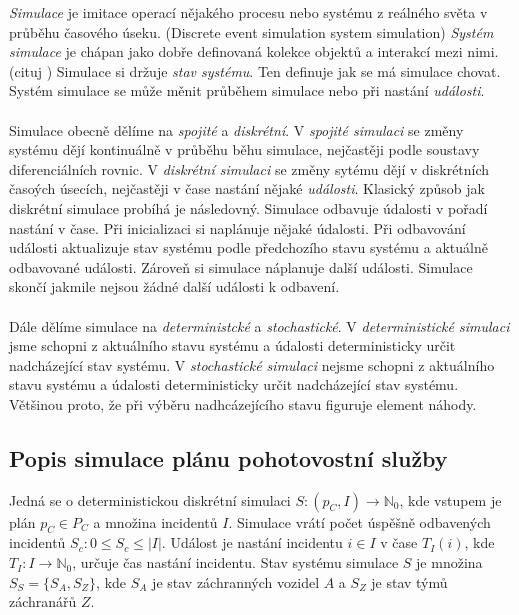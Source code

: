 \textit{Simulace} je imitace operací nějakého procesu nebo systému z reálného světa v průběhu časového úseku. (Discrete event simulation system simulation) %
\textit{Systém simulace} je chápan jako dobře definovaná kolekce objektů a interakcí mezi nimi. (cituj ) %
Simulace si držuje \textit{stav systému}. Ten definuje jak se má simulace chovat.
Systém simulace se může měnit průběhem simulace nebo při nastání \textit{události}.
\\
\\
Simulace obecně dělíme na \textit{spojité} a \textit{diskrétní}.
V \textit{spojité simulaci} se změny systému dějí kontinuálně v průběhu běhu simulace, nejčastěji podle soustavy diferenciálních rovnic.
V \textit{diskrétní simulaci} se změny sytému dějí v diskrétních časoých úsecích, nejčastěji v čase nastání nějaké \textit{události}.
Klasický způsob jak diskrétní simulace probíhá je následovný.
Simulace odbavuje údalosti v pořadí nastání v čase.
Při inicializaci si naplánuje nějaké údalosti.
Při odbavování události aktualizuje stav systému podle předchozího stavu systému a aktuálně odbavované události. Zároveň si simulace náplanuje další události. 
Simulace skončí jakmile nejsou žádné další události k odbavení.
\\
\\
Dále dělíme simulace na \textit{deterministcké} a \textit{stochastické}.
V \textit{deterministické simulaci} jsme schopni z aktuálního stavu systému a údalosti deterministicky určit nadcházející stav systému.
V \textit{stochastické simulaci} nejsme schopni z aktuálního stavu systému a údalosti deterministicky určit nadcházející stav systému.
Většinou proto, že při výběru nadhcázejícího stavu figuruje element náhody.

\clearpage

\subsection{Popis simulace plánu pohotovostní služby}

Jedná se o deterministickou diskrétní simulaci $S \colon (p_C, I) \rightarrow \mathbb{N}_0$, kde vstupem je plán $p_C \in P_C$ a množina incidentů $I$.
Simulace vrátí počet úspěšně odbavených incidentů $S_c \colon 0 \leq S_c \leq |I|$.
Událost je nastání incidentu $i \in I$ v čase $T_I(i)$, kde $T_I \colon I \rightarrow \mathbb{N}_0$, určuje čas nastání incidentu.
Stav systému simulace $S$ je množina $S_S = \{ S_A, S_Z \}$, kde $S_A$ je stav záchranných vozidel $A$ a $S_Z$ je stav týmů záchranářů $Z$. 

